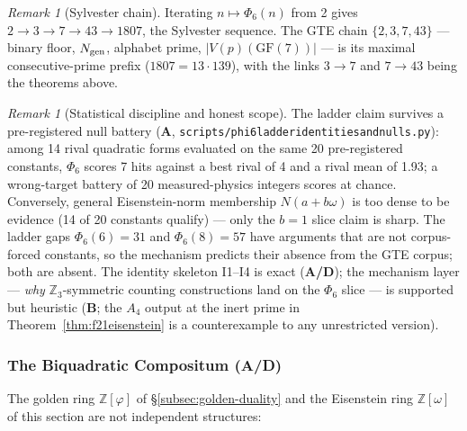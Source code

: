 \documentclass[11pt]{article}
\theoremstyle{remark}
\newtheorem{remark}[theorem]{Remark}
\newcommand{\GF}[1]{\ensuremath{\mathrm{GF}(#1)}}
\newcommand{\lean}[1]{%
  \penalty-100
  \begingroup\def\_{\textunderscore\allowbreak}\texttt{#1}\endgroup}
\newcommand{\CatA}{\textbf{A}}
\newcommand{\CatAD}{\textbf{A/D}}
\newcommand{\CatB}{\textbf{B}}
\begin{document}
\begin{remark}[Sylvester chain]
Iterating $n \mapsto \Phi_6(n)$ from 2 gives $2 \to 3 \to 7 \to 43 \to
1807$, the Sylvester sequence. The GTE chain $\{2, 3, 7, 43\}$ ---
binary floor, $N_{\rm gen}$, alphabet prime, $|V(p)(\GF{7})|$ --- is its
maximal consecutive-prime prefix ($1807 = 13 \cdot 139$), with the links
$3 \to 7$ and $7 \to 43$ being the theorems above.
\end{remark}

\begin{remark}[Statistical discipline and honest scope]
\label{rem:phi6-nulls}
The ladder claim survives a pre-registered null battery (\CatA{},
\lean{scripts/phi6\_ladder\_identities\_and\_nulls.py}): among 14 rival
quadratic forms evaluated on the same 20 pre-registered constants,
$\Phi_6$ scores 7 hits against a best rival of 4 and a rival mean of 1.93;
a wrong-target battery of 20 measured-physics integers scores at chance.
Conversely, general Eisenstein-norm membership $N(a + b\omega)$ is too
dense to be evidence (14 of 20 constants qualify) --- only the $b = 1$
slice claim is sharp. The ladder gaps $\Phi_6(6) = 31$ and $\Phi_6(8) = 57$
have arguments that are not corpus-forced constants, so the mechanism
predicts their absence from the GTE corpus; both are absent. The identity
skeleton I1--I4 is exact (\CatAD{}); the mechanism layer --- \emph{why}
$\mathbb{Z}_3$-symmetric counting constructions land on the $\Phi_6$ slice
--- is supported but heuristic (\CatB{}; the $A_4$ output at the inert
prime in Theorem~\ref{thm:f21eisenstein} is a counterexample to any
unrestricted version).
\end{remark}

\subsubsection{The Biquadratic Compositum (\CatAD{})}
\label{subsubsec:compositum}

The golden ring $\mathbb{Z}[\varphi]$ of §\ref{subsec:golden-duality} and
the Eisenstein ring $\mathbb{Z}[\omega]$ of this section are not
independent structures:
\end{document}

